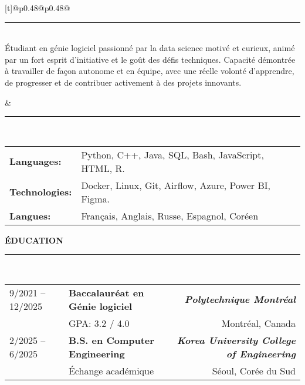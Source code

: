 \documentclass[a4paper,10pt]{article}
\begin{document}
    \noindent
    \begin{tabularx}{\textwidth}[t]{@{}p{0.48\textwidth}@{\hspace{2em}}p{0.48\textwidth}@{}}
      \parbox[t]{\linewidth}{
        \hspace{6em}\rule{\dimexpr\linewidth-6.2em}{0.4pt} \\[1em]
        Étudiant en génie logiciel passionné par la data science motivé et curieux, animé par un fort esprit d’initiative et le goût des défis techniques. Capacité démontrée à travailler de façon autonome et en équipe, avec une réelle volonté d’apprendre, de progresser et de contribuer activement à des projets innovants.
      }
      &
      \parbox[t]{\linewidth}{
        \hspace{9em}\rule{\dimexpr\linewidth-9.5em}{0.5pt} \\[1em]
        \begin{tabular}{@{}p{2.5cm}p{\dimexpr\linewidth-3.2cm}@{}}
          \textbf{Languages:} & Python, C++, Java, SQL, Bash, JavaScript, HTML, R. \\[1.5em]
          \textbf{Technologies:} & Docker, Linux, Git, Airflow, Azure, Power BI, Figma.
          \\[1.5em]
          \textbf{Langues:} & Français, Anglais, Russe, Espagnol, Coréen
        \end{tabular}
      }
    \end{tabularx}
    
    \vspace{0.2em}
    \textbf{\large ÉDUCATION} \hspace{1em}\rule{\dimexpr\linewidth-8em}{0.4pt} \\[0em]
    
    \begin{tabularx}{\textwidth}{@{}p{3cm} X r@{}}
        9/2021 -- 12/2025 & 
        \textbf{Baccalauréat en Génie logiciel} 
        & \textbf{\textit{Polytechnique Montréal}} \\ 
        & GPA: 3.2 / 4.0 & 
        Montréal, Canada \\[0.5em]
        
        2/2025 -- 6/2025 & 
        \textbf{B.S. en Computer Engineering} 
        & \textbf{\textit{Korea University College of Engineering}} \\ 
        & Échange académique & 
        Séoul, Corée du Sud &
    \end{tabularx}
    
\end{document}
